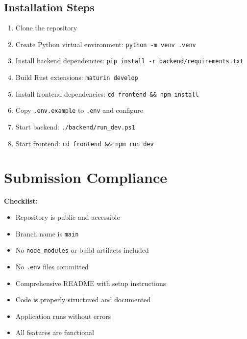 \documentclass[11pt,a4paper]{article}
\begin{document}
\subsection*{Installation Steps}
\begin{enumerate}[leftmargin=*, itemsep=6pt]
    \item Clone the repository
    \item Create Python virtual environment: \texttt{python -m venv .venv}
    \item Install backend dependencies: \texttt{pip install -r backend/requirements.txt}
    \item Build Rust extensions: \texttt{maturin develop}
    \item Install frontend dependencies: \texttt{cd frontend \&\& npm install}
    \item Copy \texttt{.env.example} to \texttt{.env} and configure
    \item Start backend: \texttt{./backend/run\_dev.ps1}
    \item Start frontend: \texttt{cd frontend \&\& npm run dev}
\end{enumerate}

\section*{Submission Compliance}

\begin{tcolorbox}[colback=successgreen!10, colframe=successgreen]
\textbf{Checklist:}
\begin{itemize}[leftmargin=*, itemsep=4pt]
    \item[\checkmark] Repository is public and accessible
    \item[\checkmark] Branch name is \texttt{main}
    \item[\checkmark] No \texttt{node\_modules} or build artifacts included
    \item[\checkmark] No \texttt{.env} files committed
    \item[\checkmark] Comprehensive README with setup instructions
    \item[\checkmark] Code is properly structured and documented
    \item[\checkmark] Application runs without errors
    \item[\checkmark] All features are functional
\end{itemize}
\end{tcolorbox}
\end{document}
